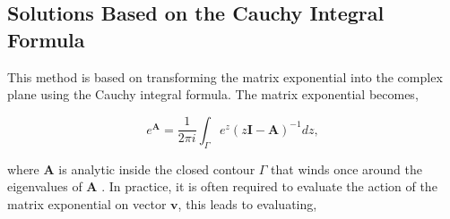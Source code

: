 
   



\subsection{Solutions Based on the Cauchy Integral Formula}
This method is based on transforming the matrix exponential into the complex plane using the Cauchy integral formula.  The matrix exponential becomes,

\begin{equation}
	e^{\boldsymbol{A}} = \frac{1}{2\pi i}\int_{\Gamma} e^{z}(z\boldsymbol{I} - \boldsymbol{A})^{-1}dz,
	\label{eq:cauchyExp}
\end{equation}

\noindent where $\boldsymbol{A}$ is analytic inside the closed contour $\Gamma$ that winds once around the eigenvalues of $\boldsymbol{A}$ \cite{pusaThesis} \cite{pusa2011} \cite{Trefethen2006}. In practice, it is often required to evaluate the action of the matrix exponential on vector $\boldsymbol{v}$, this leads to evaluating,

